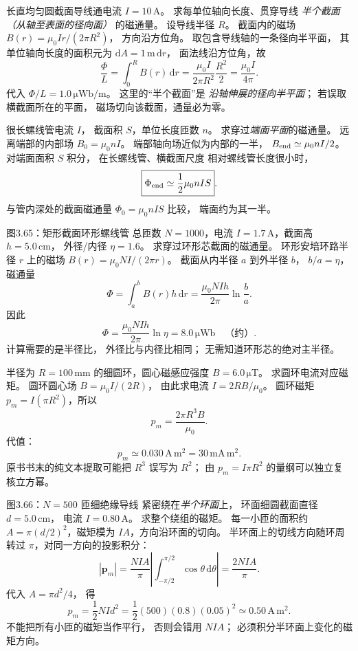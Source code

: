 长直均匀圆截面导线通电流
$I=10\,\mathrm A$。
求每单位轴向长度、贯穿导线
\emph{半个截面（从轴至表面的径向面）}
的磁通量。
\exsolution
设导线半径 $R$。
截面内的磁场
$B(r)=\mu_0Ir/(2\pi R^2)$，
方向沿方位角。
取包含导线轴的一条径向半平面，
其单位轴向长度的面积元为
$\mathrm dA=1\,\mathrm m\,\mathrm dr$，
面法线沿方位角，故
\[
\frac{\Phi}{L}=
\int_0^RB(r)\,\mathrm dr
=\frac{\mu_0I}{2\pi R^2}\frac{R^2}{2}
=\boxed{\frac{\mu_0I}{4\pi}}.
\]
代入
$\boxed{\Phi/L=1.0\,\mathrm{\mu Wb/m}}$。
\excheck 这里的“半个截面”是
\emph{沿轴伸展的径向半平面}；
若误取横截面所在的平面，
磁场切向该截面，通量必为零。

很长螺线管电流 $I$，
截面积 $S$，单位长度匝数 $n$。
求穿过\emph{端面平面}的磁通量。
\exsolution
远离端部的内部场
$B_0=\mu_0nI$。
端部轴向场近似为内部的一半，
$B_{\rm end}\simeq\mu_0nI/2$。
对端面面积 $S$ 积分，
在长螺线管、横截面尺度
相对螺线管长度很小时，
\[
\boxed{\Phi_{\rm end}\simeq
\frac12\mu_0nIS}.
\]
\excheck 与管内深处的截面磁通量
$\Phi_0=\mu_0nIS$ 比较，
端面约为其一半。

图3.65：矩形截面环形螺线管
总匝数 $N=1000$，电流
$I=1.7\,\mathrm A$，截面高
$h=5.0\,\mathrm{cm}$，
外径/内径 $\eta=1.6$。
求穿过环形芯截面的磁通量。
\exsolution
环形安培环路半径 $r$
上的磁场
$B(r)=\mu_0NI/(2\pi r)$。
截面从内半径 $a$ 到外半径 $b$，
$b/a=\eta$，
磁通量
\[
\Phi=\int_a^bB(r)h\,\mathrm dr
=\frac{\mu_0NIh}{2\pi}\ln\frac ba.
\]
因此
\[
\boxed{\Phi=
\frac{\mu_0NIh}{2\pi}\ln\eta}
=\boxed{8.0\,\mathrm{\mu Wb}}\quad\text{（约）}.
\]
\excheck 计算需要的是半径比，
外径比与内径比相同；
无需知道环形芯的绝对主半径。

半径为 $R=100\,\mathrm{mm}$
的细圆环，圆心磁感应强度
$B=6.0\,\mathrm{\mu T}$。
求圆环电流对应磁矩。
\exsolution
圆环圆心场
$B=\mu_0I/(2R)$，
由此求电流
$I=2RB/\mu_0$。
圆环磁矩
$p_m=I(\pi R^2)$，所以
\[
\boxed{p_m=\frac{2\pi R^3B}{\mu_0}}.
\]
代值：
\[
\boxed{p_m\simeq0.030\,\mathrm{A\,m^2}
=30\,\mathrm{mA\,m^2}}.
\]
\excheck 原书书末的纯文本提取可能把
$R^3$ 误写为 $R^2$；
由 $p_m=I\pi R^2$ 的量纲可以独立复核立方幂。

图3.66：$N=500$ 匝细绝缘导线
紧密绕在\emph{半个环面}上，
环面细圆截面直径
$d=5.0\,\mathrm{cm}$，
电流 $I=0.80\,\mathrm A$。
求整个绕组的磁矩。
\exsolution
每一小匝的面积约
$A=\pi(d/2)^2$，磁矩模为
$IA$，方向沿环面的切向。
半环面上的切线方向随环周
转过 $\pi$，对同一方向的投影积分：
\[
|\bm p_m|=
\frac{NIA}{\pi}
\left|\int_{-\pi/2}^{\pi/2}
\cos\theta\,\mathrm d\theta\right|
=\frac{2NIA}{\pi}.
\]
代入
$A=\pi d^2/4$，
得
\[
\boxed{p_m=\frac12NId^2
=\frac12(500)(0.8)(0.05)^2
\simeq0.50\,\mathrm{A\,m^2}}.
\]
\excheck 不能把所有小匝的磁矩当作平行，
否则会错用 $NIA$；
必须积分半环面上变化的磁矩方向。

